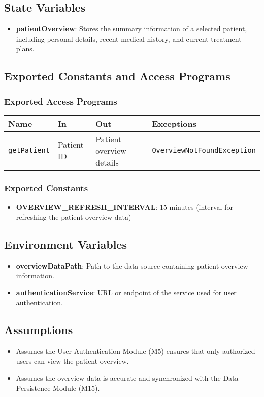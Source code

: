 \documentclass[12pt, titlepage]{article}
\begin{document}
\subsection{State Variables}
\begin{itemize}
\item \textbf{patientOverview}: Stores the summary information of a selected patient, including personal details, recent medical history, and current treatment plans.
\end{itemize}

\subsection{Exported Constants and Access Programs}
\subsubsection{Exported Access Programs}
\begin{tabular}{|l|l|l|l|}
    \hline
    \textbf{Name} & \textbf{In} & \textbf{Out} & \textbf{Exceptions} \\
    \hline 
    \texttt{getPatient} & Patient ID & Patient overview details & \texttt{OverviewNotFoundException} \\
    \hline
\end{tabular}

\subsubsection{Exported Constants}
\begin{itemize}
\item \textbf{OVERVIEW\_REFRESH\_INTERVAL}: 15 minutes (interval for refreshing the patient overview data)
\end{itemize}

\subsection{Environment Variables}
\begin{itemize}
\item \textbf{overviewDataPath}: Path to the data source containing patient overview information.
\item \textbf{authenticationService}: URL or endpoint of the service used for user authentication.
\end{itemize}

\subsection{Assumptions}
\begin{itemize}
\item Assumes the User Authentication Module (M5) ensures that only authorized users can view the patient overview.
\item Assumes the overview data is accurate and synchronized with the Data Persistence Module (M15).
\end{itemize}
\end{document}
